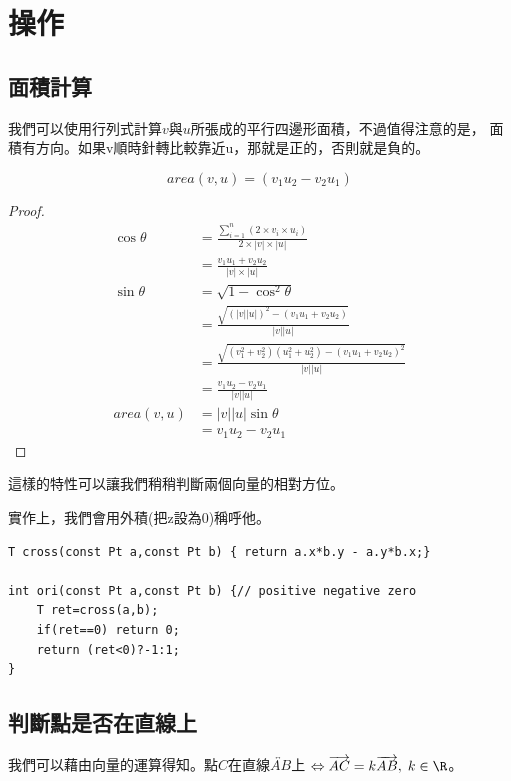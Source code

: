 \section{操作}
    \subsection{面積計算}
    我們可以使用行列式計算$v$與$u$所張成的平行四邊形面積，不過值得注意的是，
    面積有方向。如果v順時針轉比較靠近u，那就是正的，否則就是負的。

    $$area(v,u)=(v_1 u_2 - v_2 u_1)$$

    \begin{proof}
        \begin{align*}
            \cos \theta &= \frac{\sum\limits_{i=1}^{n} (2\times v_i \times u_i)}{2\times |v| \times |u|} \\
            &=\frac{v_1 u_1 + v_2 u_2}{|v| \times |u|} \\
            \sin \theta &= \sqrt{1- \cos^2 \theta} \\
            &= \frac{\sqrt{(|v||u|)^2-(v_1 u_1 + v_2 u_2)}}{|v||u|}\\
            &= \frac{\sqrt{(v_1^2+v_2^2)(u_1^2+u_2^2)-(v_1 u_1 + v_2 u_2)^2}}{|v||u|}\\
            &= \frac{v_1 u_2 - v_2 u_1}{|v||u|}\\
            area(v,u) &=|v||u|\sin \theta \\
            &=v_1 u_2 - v_2 u_1
        \end{align*}
    \end{proof}

    這樣的特性可以讓我們稍稍判斷兩個向量的相對方位。

    實作上，我們會用外積(把z設為0)稱呼他。

\begin{lstlisting}[caption= 面積計算]
T cross(const Pt a,const Pt b) { return a.x*b.y - a.y*b.x;}

int ori(const Pt a,const Pt b) {// positive negative zero
    T ret=cross(a,b);
    if(ret==0) return 0;
    return (ret<0)?-1:1;
}
\end{lstlisting}

    \subsection{判斷點是否在直線上}
    我們可以藉由向量的運算得知。點$C$在直線$\overleftrightarrow{AB}$上 
    $\Leftrightarrow \overrightarrow{AC}= k \overrightarrow{AB}, \; k \in \R$。


